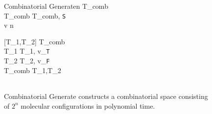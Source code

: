 


\begin{figure}[htbp]
\begin{center}

	\begin{pseudocode}{Combinatorial Generate}{n}
		T_{comb} \GETS \emptyset \\
		T_{comb} \GETS {}T_{comb}, \texttt{S} \text{)} \\ 
	
		\FOR v   n \DO
			\BEGIN
			
			[T_1,T_2] \GETS {} T_{comb}\text{)}\\
			T_1 \GETS {}T_1, v_{\texttt{T}} \text{)}\\
			T_2 \GETS {}T_2, v_{\texttt{F}} \text{)}\\
			T_{comb} \GETS {}T_1,T_2\text{)}\\
		\END
		\\
	\end{pseudocode}

\caption{{\sc Combinatorial Generate} constructs a combinatorial space consisting of $2^n$ molecular configurations in polynomial time.}
\label{combinatorialGenerate}
\end{center}
\end{figure}
